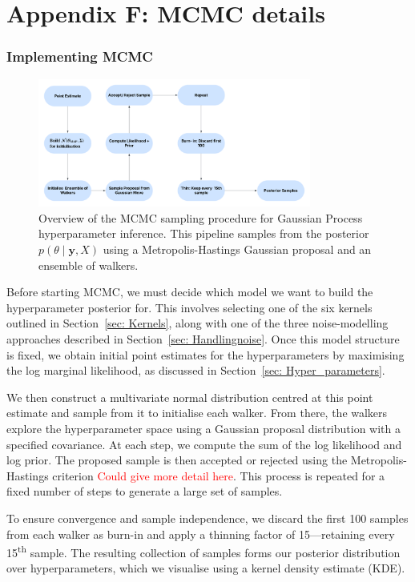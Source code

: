 \documentclass[12pt]{article}
\begin{document}
\section{Appendix F: MCMC details}
\subsubsection*{Implementing MCMC}
\begin{figure}[H]
    \centering
    \includegraphics[width=0.8\textwidth]{LatexPlots/MCMC_Flow.png}
    \caption{Overview of the MCMC sampling procedure for Gaussian Process hyperparameter inference.
     This pipeline samples from the posterior \( p(\theta \mid \mathbf{y}, X) \) using a Metropolis-Hastings Gaussian proposal and an ensemble of walkers.}
    \label{fig:MCMC flowchart}
\end{figure}

\noindent
Before starting MCMC, we must decide which model we want to build the hyperparameter posterior for. This involves selecting one of the six kernels outlined in Section~\ref{sec: Kernels}, along with one of the three noise-modelling approaches described in Section~\ref{sec: Handlingnoise}. Once this model structure is fixed, we obtain initial point estimates for the hyperparameters by maximising the log marginal likelihood, as discussed in Section~\ref{sec: Hyper_parameters}.

\noindent
We then construct a multivariate normal distribution centred at this point estimate and sample from it to initialise each walker. From there, the walkers explore the hyperparameter space using a Gaussian proposal distribution with a specified covariance. At each step, we compute the sum of the log likelihood and log prior. The proposed sample is then accepted or rejected using the Metropolis-Hastings criterion \textcolor{red}{Could give more detail here}. This process is repeated for a fixed number of steps to generate a large set of samples.

\noindent
To ensure convergence and sample independence, we discard the first 100 samples from each walker as burn-in and apply a thinning factor of 15—retaining every 15\textsuperscript{th} sample. The resulting collection of samples forms our posterior distribution over hyperparameters, which we visualise using a kernel density estimate (KDE).
\end{document}

